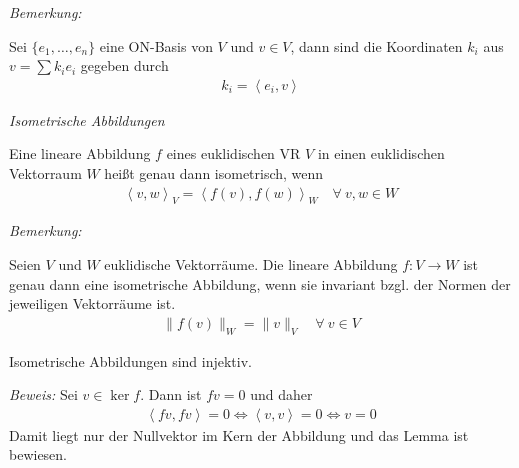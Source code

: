 \textit{Bemerkung:}

Sei $\{ e_1, \ldots, e_n \}$ eine ON-Basis von $V$ und $v \in V$, dann sind die Koordinaten $k_i$ aus $v = \sum k_i e_i$ gegeben durch
\begin{align*}
    k_i = \left\langle e_i,v \right\rangle
\end{align*}



\begin{mydef}\textit{Isometrische Abbildungen}

    Eine lineare Abbildung $f$ eines euklidischen VR $V$ in einen euklidischen Vektorraum $W$ heißt genau dann isometrisch, wenn
    \begin{align*}
        \left\langle v,w \right\rangle_V = \left\langle f(v),f(w) \right\rangle_W \quad \forall\ v,w \in W
    \end{align*}
\end{mydef}


\textit{Bemerkung:}

Seien $V$ und $W$ euklidische Vektorräume.
Die lineare Abbildung $f:V\rightarrow W$ ist genau dann eine isometrische Abbildung, wenn sie invariant bzgl. der Normen der jeweiligen Vektorräume ist.
\begin{align*}
    \| f(v) \|_W = \| v \|_V \quad \forall\ v\in V
\end{align*}

\begin{mylemma}
    Isometrische Abbildungen sind injektiv.\medskip

    \textit{Beweis:}
    Sei $v \in \ker f$. Dann ist $fv = 0$ und daher
    \begin{align*}
        \left\langle fv,fv \right\rangle = 0 \Leftrightarrow \left\langle v,v \right\rangle = 0 \Leftrightarrow v = 0
    \end{align*}
    Damit liegt nur der Nullvektor im Kern der Abbildung und das Lemma ist bewiesen.
\end{mylemma}

